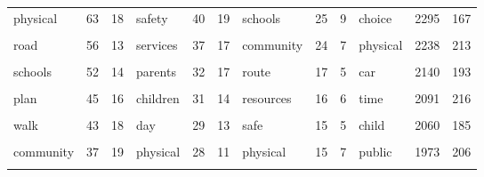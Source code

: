 \documentclass[]{elsarticle} %
\begin{document}
\begin{table}
{\begin{tabular}[t]{lcclcclcclcc}
physical & 63 & 18 & safety & 40 & 19 & schools & 25 & 9 & choice & 2295 & 167\\
\cellcolor{gray!6}{traffic} & \cellcolor{gray!6}{59} & \cellcolor{gray!6}{20} & \cellcolor{gray!6}{safe} & \cellcolor{gray!6}{39} & \cellcolor{gray!6}{19} & \cellcolor{gray!6}{children} & \cellcolor{gray!6}{25} & \cellcolor{gray!6}{6} & \cellcolor{gray!6}{activity} & \cellcolor{gray!6}{2265} & \cellcolor{gray!6}{207}\\
road & 56 & 13 & services & 37 & 17 & community & 24 & 7 & physical & 2238 & 213\\
\addlinespace
\cellcolor{gray!6}{activity} & \cellcolor{gray!6}{55} & \cellcolor{gray!6}{14} & \cellcolor{gray!6}{planning} & \cellcolor{gray!6}{37} & \cellcolor{gray!6}{7} & \cellcolor{gray!6}{bus} & \cellcolor{gray!6}{18} & \cellcolor{gray!6}{4} & \cellcolor{gray!6}{trips} & \cellcolor{gray!6}{2164} & \cellcolor{gray!6}{168}\\
schools & 52 & 14 & parents & 32 & 17 & route & 17 & 5 & car & 2140 & 193\\
\cellcolor{gray!6}{children} & \cellcolor{gray!6}{47} & \cellcolor{gray!6}{15} & \cellcolor{gray!6}{sustainable} & \cellcolor{gray!6}{31} & \cellcolor{gray!6}{8} & \cellcolor{gray!6}{zone} & \cellcolor{gray!6}{16} & \cellcolor{gray!6}{6} & \cellcolor{gray!6}{safety} & \cellcolor{gray!6}{2111} & \cellcolor{gray!6}{202}\\
plan & 45 & 16 & children & 31 & 14 & resources & 16 & 6 & time & 2091 & 216\\
\cellcolor{gray!6}{students} & \cellcolor{gray!6}{44} & \cellcolor{gray!6}{14} & \cellcolor{gray!6}{child} & \cellcolor{gray!6}{31} & \cellcolor{gray!6}{12} & \cellcolor{gray!6}{day} & \cellcolor{gray!6}{16} & \cellcolor{gray!6}{4} & \cellcolor{gray!6}{factors} & \cellcolor{gray!6}{2083} & \cellcolor{gray!6}{214}\\
\addlinespace
walk & 43 & 18 & day & 29 & 13 & safe & 15 & 5 & child & 2060 & 185\\
\cellcolor{gray!6}{public} & \cellcolor{gray!6}{39} & \cellcolor{gray!6}{15} & \cellcolor{gray!6}{routes} & \cellcolor{gray!6}{28} & \cellcolor{gray!6}{14} & \cellcolor{gray!6}{planning} & \cellcolor{gray!6}{15} & \cellcolor{gray!6}{4} & \cellcolor{gray!6}{walk} & \cellcolor{gray!6}{1985} & \cellcolor{gray!6}{198}\\
community & 37 & 19 & physical & 28 & 11 & physical & 15 & 7 & public & 1973 & 206\\
\cellcolor{gray!6}{safe} & \cellcolor{gray!6}{34} & \cellcolor{gray!6}{16} & \cellcolor{gray!6}{health} & \cellcolor{gray!6}{28} & \cellcolor{gray!6}{11} & \cellcolor{gray!6}{healthy} & \cellcolor{gray!6}{14} & \cellcolor{gray!6}{6} & \cellcolor{gray!6}{age} & \cellcolor{gray!6}{1774} & \cellcolor{gray!6}{209}\\

\end{tabular}}
\end{table}
\end{document}
